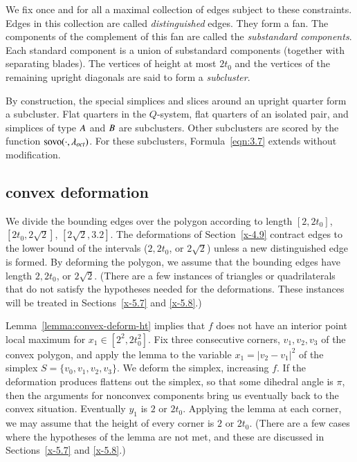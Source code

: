 We fix once and for all a maximal collection of edges subject to
these constraints. Edges in this collection are called {\it
distinguished\/} edges.  They form a fan.  The components of the complement
of this fan are
called the {\it substandard components}.  Each standard component is a union of
substandard components (together with separating blades). 
The vertices of height at most $2t_0$ and the vertices
of the remaining upright diagonals are said to form a {\it
subcluster}.


By construction, the special simplices and slices
around an upright quarter form a subcluster.  Flat quarters in the
$Q$-system, flat quarters of an isolated pair, and simplices of
type $A$ and $B$ are subclusters.  Other subclusters are
scored by the function ${\operatorname{sovo}}(\cdot,\lambda_{oct})$. 
For these subclusters,
Formula~\ref{eqn:3.7} extends without modification.


\subsection{convex deformation} %
We divide the bounding edges over the polygon according to length
$[2,2t_0]$, $[2t_0,2\sqrt{2}]$, $[2\sqrt{2},3.2]$. The deformations of
Section~\ref{x-4.9} contract edges to the lower bound of the intervals
($2,2t_0$, or $2\sqrt{2}$) unless a new distinguished edge is formed. By
deforming the polygon, we assume that the bounding edges have length
$2,2t_0$, or $2\sqrt{2}$. (There are a few instances of triangles or
quadrilaterals that do not satisfy the hypotheses needed for the
deformations. These instances will be treated in Sections~\ref{x-5.7}
and \ref{x-5.8}.)



Lemma~\ref{lemma:convex-deform-ht} 
implies that $f$ does not have an interior point local maximum
for $x_1\in[2^2,2t_0^2]$.  Fix three consecutive corners, $v_1,v_2,v_3$
of the convex polygon, and apply the lemma to the variable $x_1 =
|v_2-v_1|^2$ of the simplex $S=\{v_0,v_1,v_2,v_3\}$. We deform the simplex,
increasing $f$.  If the deformation produces flattens out the simplex, 
so that some
dihedral angle is $\pi$, then the arguments for nonconvex components bring
us eventually back to the convex situation. Eventually $y_1$ is $2$ or
$2t_0$.  Applying the lemma at each corner, we may assume that the
height of every corner is $2$ or $2t_0$.   (There are a few cases where
the hypotheses of the lemma are not met, and these are discussed in
Sections~\ref{x-5.7} and \ref{x-5.8}.)





